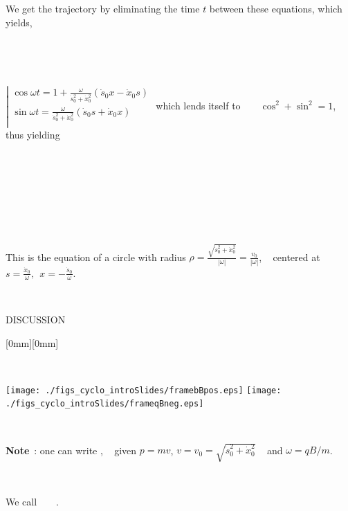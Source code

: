 \documentclass[12pt]{paper}
\newcommand{\nin}{\noindent}
\newcommand{\blue}{\color{blue}}
\begin{document}
~

~

We get the trajectory by eliminating the time $t$ between these equations, which yields, 

~

~

$\left| 
\begin{array}{l} 
 \cos\omega t  = 1 + \frac{\textstyle{\omega}}{\textstyle{\dot s_0^2+\dot x_0^2}}   (\dot s_0 x - \dot x_0 s)\\
 \sin\omega t  = \frac{\textstyle{\omega}}{\textstyle{\dot s_0^2+\dot x_0^2}}   (\dot s_0 s + \dot x_0 x) \\
\end{array} 
\right.$   which lends itself to  ~ ~ $\cos^2 + \sin^2 = 1$, thus yielding 


~

~

\hfill {}  \hfill ~




\clearpage





~

\nin This is the equation of a circle with radius 
$\rho = \frac{\textstyle{\sqrt{\dot s_0^2 + \dot x_0^2}}}{\textstyle{|\omega|}}= \frac{\textstyle{v_0}}{\textstyle{|\omega|}}$, ~ 
centered at 
$s = \frac{\textstyle{\dot x_0}}{\textstyle{\omega}}, ~ ~  x = -\frac{\textstyle{\dot s_0}}{\textstyle{\omega}}  $. 

~

\hfill DISCUSSION   \hfill ~ ~ 

   \hfill \raisebox{-10mm}[0mm][0mm]{}  \hfill ~


~

\hfill \texttt{[image: ./figs\_cyclo\_introSlides/framebBpos.eps]}  \hfill \texttt{[image: ./figs\_cyclo\_introSlides/frameqBneg.eps]} \hfill ~

~

{\bf Note}~:  one can write  {\blue {}}, ~ given $p=mv$, $v=v_0 = \sqrt{\dot s_0^2 + \dot x_0^2}$ ~ and 
$\omega = qB/m$. 

~

\hfill We call ~ ~  {\blue {}}.   \hfill ~ ~ 

~
\end{document}
